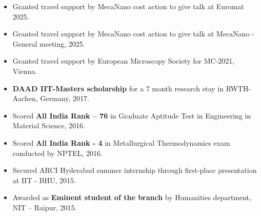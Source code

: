 
\begin{itemize}

\item Granted travel support by MecaNano cost action to give talk at Euromat 2025. 
\item Granted travel support by MecaNano cost action to give talk at MecaNano - General meeting, 2025.
\item Granted travel support by European Microscopy Society for MC-2021, Vienna.
\item \textbf{DAAD IIT-Masters scholarship} for a 7 month research stay in RWTH-Aachen, Germany, 2017.
\item Scored \textbf{All India Rank – 76} in Graduate Aptitude Test in Engineering in Material Science, 2016. 
\item Scored \textbf{All India Rank - 4} in Metallurgical Thermodynamics exam conducted by NPTEL, 2016.
\item Secured ARCI Hyderabad summer internship through first-place presentation at IIT - BHU, 2015. 
\item Awarded as \textbf{Eminent student of the branch} by Humanities department, NIT – Raipur, 2015.

\end{itemize}
